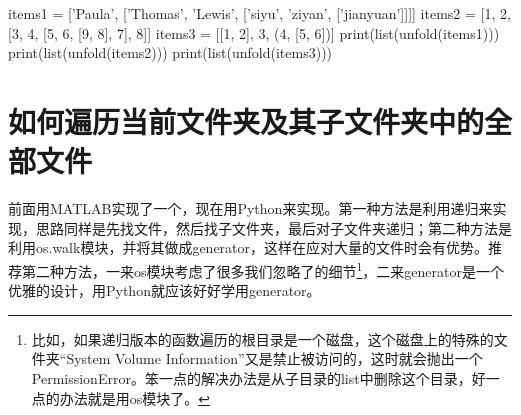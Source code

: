 \begin{pythoncode}
items1 = ['Paula', ['Thomas', 'Lewis', ['siyu', 'ziyan', ['jianyuan']]]]
items2 = [1, 2, [3, 4, [5, 6, [9, 8], 7], 8]]
items3 = [[1, 2], 3, (4, [5, 6])]
print(list(unfold(items1)))
print(list(unfold(items2)))
print(list(unfold(items3)))
\end{pythoncode}

\section{如何遍历当前文件夹及其子文件夹中的全部文件}

前面用MATLAB实现了一个，现在用Python来实现。第一种方法是利用递归来实现，思路同样是先找文件，然后找子文件夹，最后对子文件夹递归；第二种方法是利用os.walk模块，并将其做成generator，这样在应对大量的文件时会有优势。推荐第二种方法，一来os模块考虑了很多我们忽略了的细节\footnote{比如，如果递归版本的函数遍历的根目录是一个磁盘，这个磁盘上的特殊的文件夹“System Volume Information”又是禁止被访问的，这时就会抛出一个PermissionError。笨一点的解决办法是从子目录的list中删除这个目录，好一点的办法就是用os模块了。}，二来generator是一个优雅的设计，用Python就应该好好学用generator。



